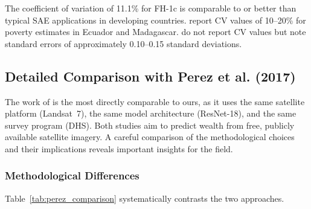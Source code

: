 \documentclass[11pt,a4paper]{article}
\begin{document}
The coefficient of variation of 11.1\% for FH-1c is comparable to or better than typical SAE applications in developing countries. \citet{elbers2003} report CV values of 10--20\% for poverty estimates in Ecuador and Madagascar. \citet{ratledge2021} do not report CV values but note standard errors of approximately 0.10--0.15 standard deviations.

\subsection{Detailed Comparison with Perez et al. (2017)}

The work of \citet{perez2017} is the most directly comparable to ours, as it uses the same satellite platform (Landsat~7), the same model architecture (ResNet-18), and the same survey program (DHS). Both studies aim to predict wealth from free, publicly available satellite imagery. A careful comparison of the methodological choices and their implications reveals important insights for the field.

\subsubsection{Methodological Differences}

Table~\ref{tab:perez_comparison} systematically contrasts the two approaches.
\end{document}
